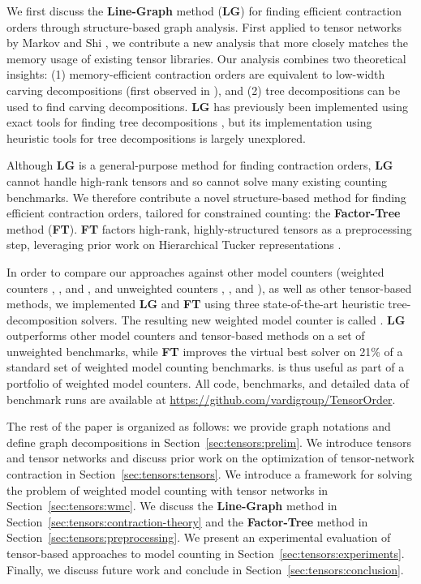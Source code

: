 We first discuss the \textbf{Line-Graph} method (\textbf{LG}) for finding efficient contraction orders through structure-based graph analysis. First applied to tensor networks by Markov and Shi \cite{MS08}, we contribute a new analysis that more closely matches the memory usage of existing tensor libraries. Our analysis combines two theoretical insights: (1) memory-efficient contraction orders are equivalent to low-width carving decompositions (first observed in \cite{de15}), and (2) tree decompositions can be used to find carving decompositions. \textbf{LG} has previously been implemented using exact tools for finding tree decompositions \cite{DFGHSW18}, but its implementation using heuristic tools for tree decompositions is largely unexplored.

Although \textbf{LG} is a general-purpose method for finding contraction orders, \textbf{LG} cannot handle high-rank tensors and so cannot solve many existing counting benchmarks. We therefore contribute a novel structure-based method for finding efficient contraction orders, tailored for constrained counting: the \textbf{Factor-Tree} method (\textbf{FT}). \textbf{FT} factors high-rank, highly-structured tensors as a preprocessing step, leveraging prior work on Hierarchical Tucker representations \cite{Grasedyck10}.

In order to compare our approaches against other model counters (weighted counters  \cite{SBK05},  \cite{OD15}, and  \cite{LM17}, and unweighted counters  \cite{CW16},  \cite{FHMW17}, and  \cite{Thurley2006}), as well as other tensor-based methods, we implemented \textbf{LG} and \textbf{FT} using three state-of-the-art heuristic tree-decomposition solvers. The resulting new weighted model counter is called . \textbf{LG} outperforms other model counters and tensor-based methods on a set of unweighted benchmarks, while \textbf{FT} improves the virtual best solver on 21\% of a standard set of weighted model counting benchmarks.  is thus useful as part of a portfolio of weighted model counters. All code, benchmarks, and detailed data of benchmark runs are available at \url{https://github.com/vardigroup/TensorOrder}.


The rest of the paper is organized as follows: we provide graph notations and define graph decompositions in Section~\ref{sec:tensors:prelim}. We introduce tensors and tensor networks and discuss prior work on the optimization of tensor-network contraction in Section~\ref{sec:tensors:tensors}. We introduce a framework for solving the problem of weighted model counting with tensor networks in Section~\ref{sec:tensors:wmc}. We discuss the \textbf{Line-Graph} method in Section~\ref{sec:tensors:contraction-theory} and the \textbf{Factor-Tree} method in Section~\ref{sec:tensors:preprocessing}. We present an experimental evaluation of tensor-based approaches to model counting in Section~\ref{sec:tensors:experiments}. Finally, we discuss future work and conclude in Section~\ref{sec:tensors:conclusion}.